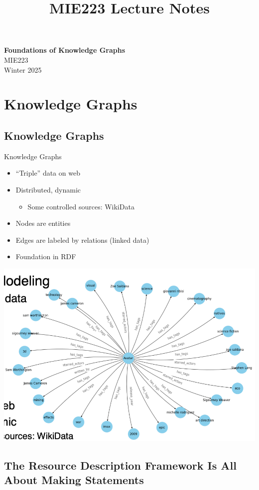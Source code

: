 \documentclass[11pt]{article}
\theoremstyle{definition}
\begin{document}
\setcounter{section}{0}
\title{MIE223 Lecture Notes}

\thispagestyle{empty}

\begin{center}
{\LARGE \bf Foundations of Knowledge Graphs}\\
{\large MIE223}\\
Winter 2025
\end{center}
\section{Knowledge Graphs}

\subsection{Knowledge Graphs}
Knowledge
Graphs

\begin{itemize}
    \item “Triple” data on web
    \item Distributed, dynamic
    \begin{itemize}
        \item Some controlled sources: WikiData
    \end{itemize}
    \item Nodes are entities
    \item Edges are labeled by relations (linked data)
    \item Foundation in RDF
\end{itemize}

\includegraphics[width=\textwidth/2]{1.png}

\subsection{The Resource Description Framework Is
All About Making Statements}
\end{document}
